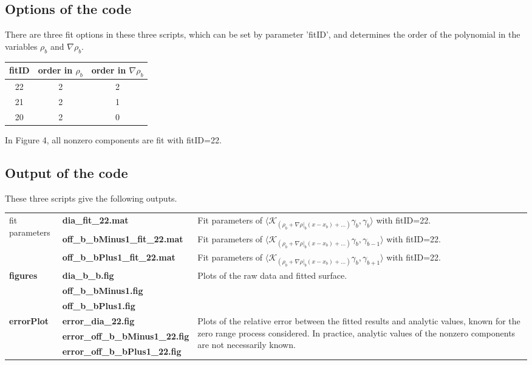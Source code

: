 \documentclass[authoryear,3p,11pt]{elsarticle}
\begin{document}
\subsection{Options of the code} 
There are three fit options in these three scripts, which can be set by parameter 'fitID', and determines the order of the polynomial in the variables $\rho_b$ and $\nabla \rho_b$.

\begin{center}
\begin{tabular}{|c|c|c|}
\hline
fitID  & order in $\rho_b$ &  order in $\nabla \rho_b$ \\
\hline
 22                & 2          & 2\\
\hline
21	& 2          & 1\\
\hline
20	& 2          & 0\\
\hline
\end{tabular}
\end{center}

In Figure 4, all nonzero components are fit with fitID=22. 

\subsection{Output of the code} 
These three scripts give the following outputs. 

\begin{center}
\begin{tabular}{ |l|l|p{76mm}| }
\hline
\multirow{3}{*}{fit parameters} &  {\bf dia\_fit\_22.mat} & {\centering Fit parameters of $\langle  \mathcal{K}_{\left(\rho_b+ \nabla \rho|_b (x-x_b) +\ldots\right)}\gamma_b,\gamma_{b} \rangle$ with fitID=22. }\\ 
\cline{2-3}
& {\bf off\_b\_bMinus1\_fit\_22.mat} &  Fit parameters of  $\langle  \mathcal{K}_{\left(\rho_b+ \nabla \rho|_b (x-x_b) +\ldots\right)}\gamma_b,\gamma_{b-1} \rangle$ with fitID=22. \\ 
\cline{2-3}
& {\bf off\_b\_bPlus1\_fit\_22.mat} &  Fit parameters of  $\langle  \mathcal{K}_{\left(\rho_b+ \nabla \rho|_b (x-x_b) +\ldots\right)}\gamma_b,\gamma_{b+1} \rangle$ with fitID=22. \\ 
\hline
\multirow{3}{*}{{\bf figures}} &  {\bf dia\_b\_b.fig} & Plots of the raw data and fitted surface. \\ 
& {\bf off\_b\_bMinus1.fig} &  \\ 
& {\bf off\_b\_bPlus1.fig} & \\ 
\hline
\multirow{2}{*}{{\bf errorPlot}} &  {\bf error\_dia\_22.fig} & \multirow{3}{75mm}{Plots of the relative error between the fitted results and analytic values, known for the zero range process considered. In practice, analytic values of the nonzero components are not necessarily known.} \\
& {\bf error\_off\_b\_bMinus1\_22.fig}  & \\ 
& {\bf error\_off\_b\_bPlus1\_22.fig} &  \\ [10mm] 
\hline
\end{tabular}
\end{center}
\end{document}
